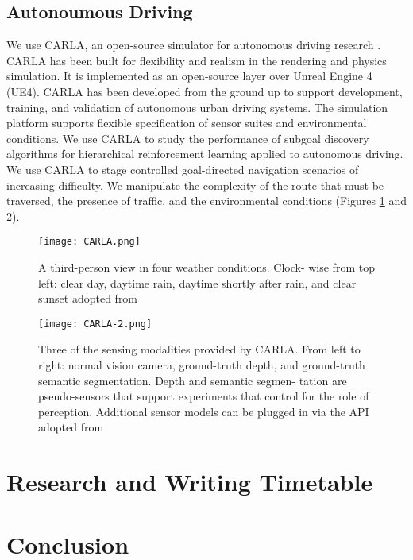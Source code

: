 \documentclass[letterpaper,titlepage]{article}
\begin{document}
\subsection{Autonoumous Driving}

We use CARLA, an open-source simulator for autonomous driving research \citep{CARLA:2017}. CARLA has been built for flexibility and realism in the rendering and physics simulation. It is implemented as an open-source layer over Unreal Engine 4 (UE4). CARLA has been developed from the ground up to support development, training, and validation of autonomous urban driving systems. The simulation platform supports flexible specification of sensor suites and environmental conditions. We use CARLA to study the performance of subgoal discovery algorithms for hierarchical reinforcement learning applied to autonomous driving. We use CARLA to stage controlled goal-directed navigation scenarios of increasing difficulty. We manipulate the complexity of the route that must be traversed, the presence of traffic, and the environmental conditions (Figures \ref{g:CARLA} and \ref{g:CARLA-2}). 
\begin{figure}[H]
\centering
\texttt{[image: CARLA.png]}
\caption{A third-person view in four weather conditions. Clock- wise from top left: clear day, daytime rain, daytime shortly after rain, and clear sunset adopted from \citep{CARLA:2017}}
\label{g:CARLA}
\end{figure}

\begin{figure}[H]
\centering
\texttt{[image: CARLA-2.png]}
\caption{Three of the sensing modalities provided by CARLA. From left to right: normal vision camera, ground-truth depth, and ground-truth semantic segmentation. Depth and semantic segmen- tation are pseudo-sensors that support experiments that control for the role of perception. Additional sensor models can be plugged in via the API adopted from \citep{CARLA:2017}}
\label{g:CARLA-2}
\end{figure}


\newpage
\section{Research and Writing Timetable}
\label{sec:timetable}

\newpage
\section{Conclusion}
\label{sec:conclusion}

\newpage


\end{document}
